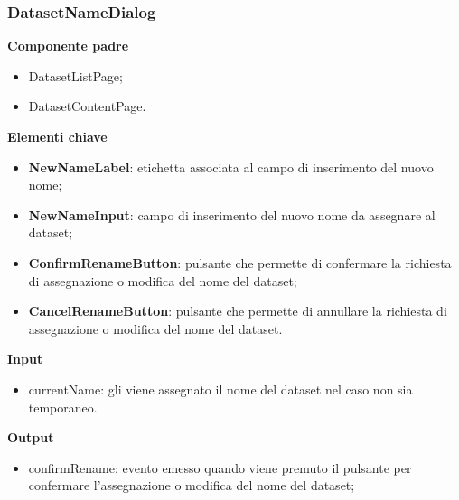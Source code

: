 \subsubsection{DatasetNameDialog}
\textbf{Componente padre}
\begin{itemize}
    \item DatasetListPage;
    \item DatasetContentPage.
\end{itemize}
\textbf{Elementi chiave}
\begin{itemize}
    \item \textbf{NewNameLabel}: etichetta associata al campo di inserimento del nuovo nome;
    \item \textbf{NewNameInput}: campo di inserimento del nuovo nome da assegnare al dataset;
    \item \textbf{ConfirmRenameButton}: pulsante che permette di confermare la richiesta di assegnazione o modifica del nome del dataset;
    \item \textbf{CancelRenameButton}: pulsante che permette di annullare la richiesta di assegnazione o modifica del nome del dataset.
\end{itemize}
\textbf{Input}
\begin{itemize}
    \item currentName: gli viene assegnato il nome del dataset nel caso non sia temporaneo.
\end{itemize}
\textbf{Output}
\begin{itemize}
    \item confirmRename: evento emesso quando viene premuto il pulsante per confermare l'assegnazione o modifica del nome del dataset;
\end{itemize}
